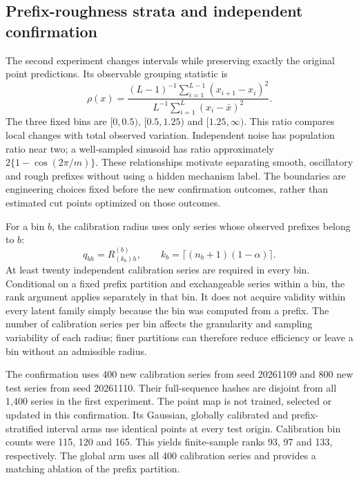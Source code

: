 \subsection{Prefix-roughness strata and independent confirmation}
\label{sec:browser-strata}

The second experiment changes intervals while preserving exactly the original
point predictions. Its observable grouping statistic is
\begin{equation}
 \rho(x)=\frac{(L-1)^{-1}\sum_{i=1}^{L-1}(x_{i+1}-x_i)^2}
 {L^{-1}\sum_{i=1}^L(x_i-\bar x)^2}.
 \label{eq:browser-roughness}
\end{equation}
The three fixed bins are $[0,0.5)$, $[0.5,1.25)$ and $[1.25,\infty)$.
This ratio compares local changes with total observed variation. Independent
noise has population ratio near two; a well-sampled sinusoid has ratio
approximately $2\{1-\cos(2\pi/m)\}$. These relationships motivate separating
smooth, oscillatory and rough prefixes without using a hidden mechanism label.
The boundaries are engineering choices fixed before the new confirmation
outcomes, rather than estimated cut points optimized on those outcomes.

For a bin $b$, the calibration radius uses only series whose observed prefixes
belong to $b$:
\begin{equation}
 q_{bh}=R_{(k_b)h}^{(b)},\qquad
 k_b=\lceil(n_b+1)(1-\alpha)\rceil.
 \label{eq:browser-group-radius}
\end{equation}
At least twenty independent calibration series are required in every bin.
Conditional on a fixed prefix partition and exchangeable series within a bin,
the rank argument applies separately in that bin. It does not acquire validity
within every latent family simply because the bin was computed from a prefix.
The number of calibration series per bin affects the granularity and sampling
variability of each radius; finer partitions can therefore reduce efficiency
or leave a bin without an admissible radius.

The confirmation uses 400 new calibration series from seed 20261109 and 800
new test series from seed 20261110. Their full-sequence hashes are disjoint
from all 1,400 series in the first experiment. The point map is not trained,
selected or updated in this confirmation. Its Gaussian, globally calibrated
and prefix-stratified interval arms use identical points at every test origin.
Calibration bin counts were 115, 120 and 165. This yields finite-sample ranks
93, 97 and 133, respectively. The global arm uses all 400 calibration series
and provides a matching ablation of the prefix partition.

